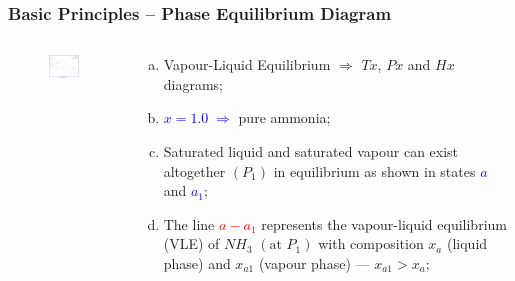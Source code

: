 \documentclass[10pt,compress]{beamer}
\begin{document}
\begin{frame}
 \frametitle{Basic Principles -- Phase Equilibrium Diagram} 
  \begin{columns}
   \begin{column}[c]{0.45\linewidth}
    \begin{figure}%
     \includegraphics[width=5.5cm,height=5.cm,clip]{./Pics/Overview_Refrig34}
    \end{figure}  
   \end{column}  
   \begin{column}[c]{0.55\linewidth}
    \begin{enumerate}[(a)]
     \item <1-> Vapour-Liquid Equilibrium $\Longrightarrow$ $Tx$, $Px$ and $Hx$ diagrams;
     \item <2-> \textcolor{blue}{$x=1.0\;\Longrightarrow$} pure ammonia;
     \item <3-> Saturated liquid and saturated vapour can exist altogether $\left(P_{1}\right)$ in equilibrium as shown in states \textcolor{blue}{$a$} and \textcolor{blue}{$a_{1}$};
     \item <4-> The line \textcolor{red}{$a-a_{1}$} represents the vapour-liquid equilibrium (VLE) of $NH_{3}$ $\left(\text{at }P_{1}\right)$ with composition $x_{a}$ (liquid phase) and $x_{a1}$ (vapour phase) --- $x_{a1}>x_{a}$;
   \end{enumerate}
  \end{column}  
 \end{columns}  
\end{frame}
\end{document}
